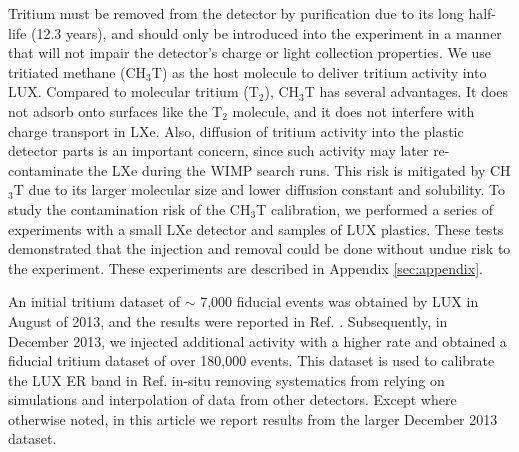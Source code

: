 Tritium must be removed from the detector by purification due to its long half-life (12.3 years\cite{Tritium_halflife_all}), and should only be introduced into the experiment in a manner that will not impair the detector's charge or light collection properties. We use tritiated methane (CH$_3$T) as the host molecule to deliver tritium activity into LUX. Compared to molecular tritium (T$_2$), CH$_3$T has several advantages. It does not adsorb onto surfaces like the T$_2$ molecule, and it does not interfere with charge transport in LXe. Also, diffusion of tritium activity into the plastic detector parts is an important concern, since such activity may later re-contaminate the LXe during the WIMP search runs.  This risk is mitigated by CH$_3$T due to its larger molecular size and lower diffusion constant and solubility. To study the contamination risk of the CH$_3$T calibration, we performed a series of experiments with a small LXe detector and samples of LUX plastics. These tests demonstrated that the injection and removal could be done without undue risk to the experiment. These experiments are described in Appendix \ref{sec:appendix}.

An initial tritium dataset of $\sim$ 7,000 fiducial events was obtained by LUX in August of 2013, and the results were reported in Ref. \cite{lux-prl}. Subsequently, in December 2013, we injected additional activity with a higher rate and obtained a fiducial tritium dataset of over 180,000 events. This dataset is used to calibrate the LUX ER band in Ref. \cite{lux-reanalysis} in-situ removing systematics from relying on simulations and interpolation of data from other detectors. Except where otherwise noted, in this article we report results from the larger December 2013 dataset.